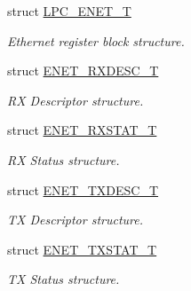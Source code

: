\begin{DoxyCompactItemize}
struct \hyperlink{struct_l_p_c___e_n_e_t___t}{L\+P\+C\+\_\+\+E\+N\+E\+T\+\_\+\+T}
\begin{DoxyCompactList}\small\item\em Ethernet register block structure. \end{DoxyCompactList}\item 
struct \hyperlink{struct_e_n_e_t___r_x_d_e_s_c___t}{E\+N\+E\+T\+\_\+\+R\+X\+D\+E\+S\+C\+\_\+\+T}
\begin{DoxyCompactList}\small\item\em R\+X Descriptor structure. \end{DoxyCompactList}\item 
struct \hyperlink{struct_e_n_e_t___r_x_s_t_a_t___t}{E\+N\+E\+T\+\_\+\+R\+X\+S\+T\+A\+T\+\_\+\+T}
\begin{DoxyCompactList}\small\item\em R\+X Status structure. \end{DoxyCompactList}\item 
struct \hyperlink{struct_e_n_e_t___t_x_d_e_s_c___t}{E\+N\+E\+T\+\_\+\+T\+X\+D\+E\+S\+C\+\_\+\+T}
\begin{DoxyCompactList}\small\item\em T\+X Descriptor structure. \end{DoxyCompactList}\item 
struct \hyperlink{struct_e_n_e_t___t_x_s_t_a_t___t}{E\+N\+E\+T\+\_\+\+T\+X\+S\+T\+A\+T\+\_\+\+T}
\begin{DoxyCompactList}\small\item\em T\+X Status structure. \end{DoxyCompactList}\end{DoxyCompactItemize}
